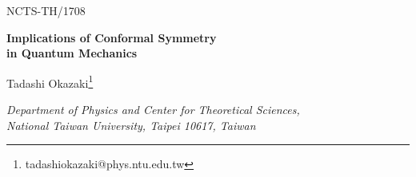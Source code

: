 \documentclass[12pt]{article}
\numberwithin{equation}{section}
\begin{document}
\thispagestyle{empty}
\begin{flushright}
NCTS-TH/1708
\\


\end{flushright}
\vskip2.5cm
\begin{center}
{\Large 
\bf 
Implications of Conformal Symmetry \\ 
in Quantum Mechanics}


\vskip2cm
Tadashi Okazaki\footnote{tadashiokazaki@phys.ntu.edu.tw} 

\bigskip
{\it 
Department of Physics and Center for Theoretical Sciences,\\
National Taiwan University, Taipei 10617, Taiwan}
\\


\end{center}





\vskip2cm
\begin{abstract}
In conformal quantum mechanics with the vacuum of a real scaling dimension 
and with a complete orthonormal set of energy eigenstates 
which is preferable under the unitary evolution, 
the dilatation expectation value between energy eigenstates 
monotonically decreases along the flow from the UV to the IR. 
In such conformal quantum mechanics there exist bounds on scaling dimensions 
of the physical states and the gauge operators. 
\end{abstract}

\newpage
\setcounter{tocdepth}{2}
\tableofcontents
\end{document}
